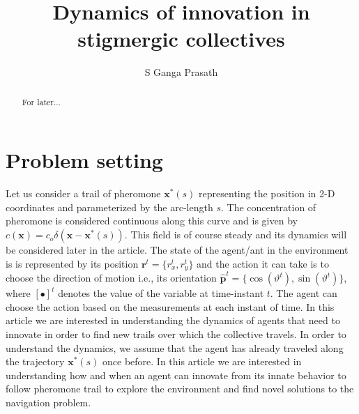 \documentclass[%
reprint,
superscriptaddress,
floatfix,
amsmath,
amssymb,
aps,
notitlepage
]{revtex4-1}
\def\r{\mathbf{r}}
\def\x{\mathbf{x}}
\def\ph{\hat{\mathbf{p}}}
\def\theta{\vartheta}
\begin{document}
\title{Dynamics of innovation in stigmergic collectives}
\author{S Ganga Prasath}
\date{}

\begin{abstract}
For later...
\end{abstract}

\maketitle
\section{Problem setting}
Let us consider a trail of pheromone $\x^*(s)$ representing the position in 2-D coordinates and parameterized by the
arc-length $s$. The concentration of pheromone is considered continuous along this curve and is given by $c(\x) = c_o \delta(\x-\x^*(s))$.
This field is of course steady and its dynamics will be considered later in the article. The state of the agent/ant in
the environment is is represented by its position $\r^t=\{ r_x^t, r_y^t \}$ and the action it can take is to choose the
direction of motion i.e., its orientation $\ph^t = \{\cos(\theta^t), \sin(\theta^t)\}$, where $[\bullet]^t$ denotes the
value of the variable at time-instant $t$. The agent can choose the action based on the measurements at each instant of time.
In this article we are interested in understanding the dynamics of agents that need to innovate in order to find new
trails over which the collective travels. In order to understand the dynamics, we assume that the agent has already
traveled along the trajectory $\x^*(s)$ once before.
In this article we are interested in understanding how and when an agent can innovate from its innate behavior to follow
pheromone trail to explore the environment and find novel solutions to the navigation problem. 
\end{document}
